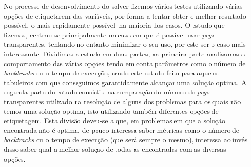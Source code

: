 \documentclass{llncs}
\begin{document}
No processo de desenvolvimento do solver fizemos v\'{a}rios testes utilizando v\'{a}rias op\c{c}\~{o}es de etiquetarem das vari\'{a}veis, por forma a tentar obter o melhor resultado poss\'{i}vel, o mais rapidamente poss\'{i}vel, na maioria dos casos.
O estudo que fizemos, centrou-se principalmente no caso em que \'{e} poss\'{i}vel usar \emph{pegs} transparentes, tentando no entanto minimizar o seu uso, por este ser o caso mais interessante.
Dividimos o estudo em duas partes, na primeira parte analisamos o comportamento das v\'{a}rias op\c{c}\~{o}es tendo em conta par\^{a}metros como o n\'{u}mero de \emph{backtracks} ou o tempo de execu\c{c}\~{a}o, sendo este estudo feito para aqueles tabuleiros com que conseguimos garantidamente alcan\c{c}ar uma solu\c{c}\~{a}o optima.
A segunda parte do estudo consistiu na compara\c{c}\~{a}o do n\'{u}mero de \emph{pegs} transparentes utilizado na resolu\c{c}\~{a}o de alguns dos problemas para os quais n\~{a}o temos uma solu\c{c}\~{a}o optima, isto utilizando tamb\'{e}m diferentes op\c{c}\~{o}es de etiquetagem.
Esta divis\~{a}o deveu-se a que, em problemas em que a solu\c{c}\~{a}o encontrada n\~{a}o \'{e} optima, de pouco interessa saber m\'{e}tricas como o n\'{u}mero de \emph{backtracks} ou o tempo de execu\c{c}\~{a}o (que ser\'{a} sempre o mesmo), interessa ao inv\'{e}s disso saber qual a melhor solu\c{c}\~{a}o de todas as encontradas com as diversas op\c{c}\~{o}es.
\end{document}
